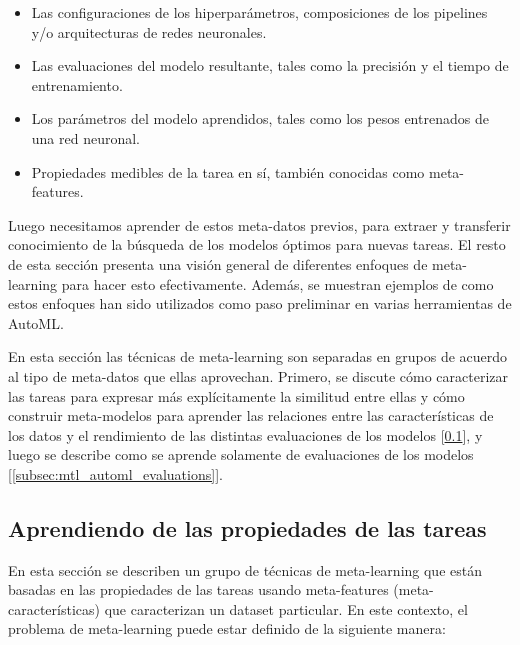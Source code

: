 \begin{itemize}
	\item Las configuraciones de los hiperparámetros, composiciones de los pipelines y/o arquitecturas de redes neuronales.
	\item Las evaluaciones del modelo resultante, tales como la precisión y el tiempo de entrenamiento.
	\item Los parámetros del modelo aprendidos, tales como los pesos entrenados de una red neuronal.
	\item Propiedades medibles de la tarea en sí, también conocidas como meta-features.
\end{itemize}

Luego necesitamos aprender de estos meta-datos previos, para extraer y transferir conocimiento de la búsqueda de los modelos óptimos para nuevas tareas. El resto de esta sección presenta una visión general de diferentes enfoques de meta-learning para hacer esto efectivamente. Además, se muestran ejemplos de como estos enfoques han sido utilizados como paso preliminar en varias herramientas de AutoML.

En esta sección las técnicas de meta-learning son separadas en grupos de acuerdo al tipo de meta-datos que ellas aprovechan. Primero, se discute cómo caracterizar las tareas para expresar más explícitamente la similitud entre ellas y cómo construir meta-modelos para aprender las relaciones entre las características de los datos y el rendimiento de las distintas evaluaciones de los modelos [\ref{subsec:mtl_automl_proprerties}], y luego se describe como se aprende solamente de evaluaciones de los modelos [\ref{subsec:mtl_automl_evaluations}].

\subsection{Aprendiendo de las propiedades de las tareas}\label{subsec:mtl_automl_proprerties}


En esta sección se describen un grupo de técnicas de meta-learning que están basadas en las propiedades de las tareas usando meta-features (meta-características) que caracterizan un dataset particular. En este contexto, el problema de meta-learning puede estar definido de la siguiente manera:

